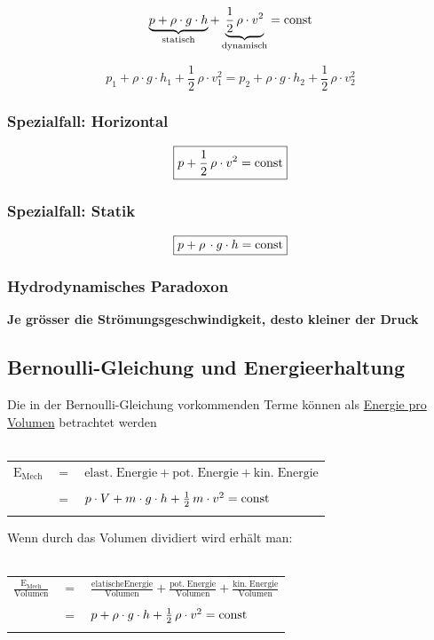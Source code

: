 $$ \underbrace{ p + \rho \cdot g \cdot h }_{\substack{\mathrm{statisch}}} + \underbrace{ \frac{1}{2} \, \rho \cdot v^2 }_{\substack{\mathrm{dynamisch}}} = \mathrm{const} $$
	
	$$ \boxed{ p_1 +  \rho \cdot g \cdot h_1 + \frac{1}{2} \, \rho \cdot v_1^2 = p_2 +  \rho \cdot g \cdot h_2 + \frac{1}{2} \, \rho \cdot v_2^2 } $$


\subsubsection{Spezialfall: Horizontal}

$$ \boxed{ p + \frac{1}{2} \, \rho \cdot v^2 = \mathrm{const} } $$


\subsubsection{Spezialfall: Statik}

$$  \boxed{ p + \rho \, \cdot g \cdot h =  \mathrm{const}} $$




\subsubsection{Hydrodynamisches Paradoxon}
\textbf{Je grösser die Strömungsgeschwindigkeit, desto kleiner der Druck} \\





\subsection{Bernoulli-Gleichung und Energieerhaltung} %
Die in der Bernoulli-Gleichung vorkommenden Terme können als \underline{Energie pro Volumen} betrachtet werden \\
\\
\begin{tabular}{l c l}
$  \mathrm{E_{Mech}}$ & $=$ & $\mathrm{elast. \; Energie +  pot. \; Energie + kin. \; Energie}$ \\
\\
& $=$ & $ p \cdot V + m \cdot g \cdot h + \frac{1}{2} \, m \cdot v^2 = \mathrm{const}$ \\
\\
\end{tabular}


Wenn durch das Volumen dividiert wird erhält man: \\
\\
\begin{tabular}{l c l}
$  \mathrm{\frac{E_{Mech}}{Volumen}}$ & $=$ & $\mathrm{\frac{elatische Energie}{Volumen}   + \frac{pot. \; Energie}{Volumen} + \frac{kin. \; Energie}{Volumen}}$ \\
\\
& $=$ & $ p + \rho \cdot g \cdot h + \frac{1}{2} \,  \rho \cdot v^2 =\mathrm{const}$ \\
\\
\end{tabular}


